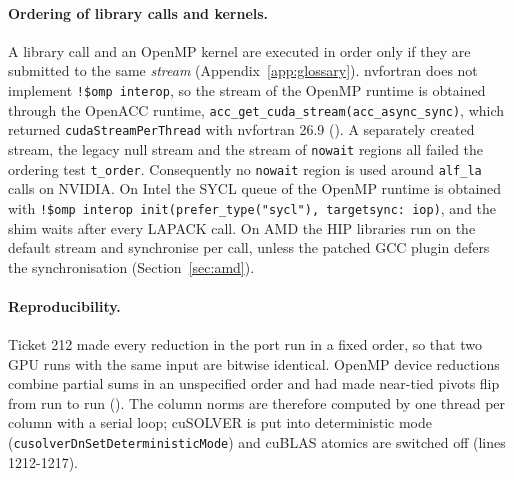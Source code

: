 \paragraph{Ordering of library calls and kernels.} A library call and an OpenMP kernel are executed in order only if they are submitted to the same \emph{stream} (Appendix~\ref{app:glossary}). nvfortran does not implement \texttt{!\$omp interop}, so the stream of the OpenMP runtime is obtained through the OpenACC runtime, \texttt{acc\_get\_cuda\_stream(acc\_async\_sync)}, which returned \texttt{cudaStreamPerThread} with nvfortran 26.9 (). A separately created stream, the legacy null stream and the stream of \texttt{nowait} regions all failed the ordering test \texttt{t\_order}. Consequently no \texttt{nowait} region is used around \texttt{alf\_la} calls on NVIDIA. On Intel the SYCL queue of the OpenMP runtime is obtained with \texttt{!\$omp interop init(prefer\_type("sycl"), targetsync: iop)}, and the shim waits after every LAPACK call. On AMD the HIP libraries run on the default stream and synchronise per call, unless the patched GCC plugin defers the synchronisation (Section~\ref{sec:amd}).

\paragraph{Reproducibility.} Ticket 212 made every reduction in the port run in a fixed order, so that two GPU runs with the same input are bitwise identical. OpenMP device reductions combine partial sums in an unspecified order and had made near-tied pivots flip from run to run (). The column norms are therefore computed by one thread per column with a serial loop; cuSOLVER is put into deterministic mode (\texttt{cusolverDnSetDeterministicMode}) and cuBLAS atomics are switched off (lines 1212-1217).



